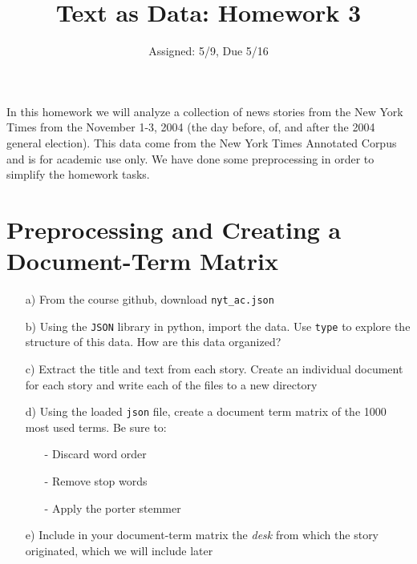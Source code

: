 \documentclass[12pt,letterpaper]{article}
\title{Text as Data: Homework 3}
\date{Assigned: 5/9, Due 5/16}
\begin{document}
\maketitle

In this homework we will analyze a collection of news stories from the New York Times from the November 1-3, 2004 (the day before, of, and after the 2004 general election). This data come from the New York Times Annotated Corpus and is for academic use only. We have done some preprocessing in order to simplify the homework tasks.


\section{Preprocessing and Creating a Document-Term Matrix}

\begin{itemize}
\item[a)] From the course github, download {\tt nyt\_ac.json} 
\item[b)] Using the {\tt JSON} library in python, import the data. Use {\tt type} to explore the structure of this data. How are this data organized?
\item[c)] Extract the title and text from each story.  Create an individual document for each story and write each of the files to a new directory 
\item[d)] Using the loaded {\tt json} file, create a document term matrix of the 1000 most used terms.  Be sure to: 
\begin{itemize}
\item[-] Discard word order
\item[-] Remove stop words
\item[-] Apply the porter stemmer
\end{itemize}
\item[e)] Include in your document-term matrix the \emph{desk} from which the story originated, which we will include later
\end{itemize}

\end{document}

